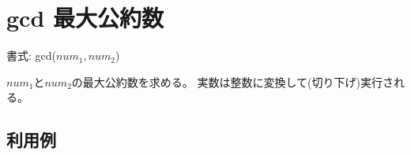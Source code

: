 
%

\section{gcd 最大公約数\label{sect:gcd}}

書式: gcd($num_1,num_2$)

$num_1$と$num_2$の最大公約数を求める。
実数は整数に変換して(切り下げ)実行される。

\subsection*{利用例}


%

